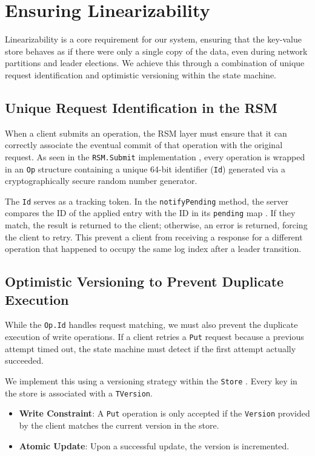 \section{Ensuring Linearizability}
\label{sec:linearizability_impl}
Linearizability is a core requirement for our system, ensuring that the key-value store behaves as if there were only a single copy of the data, even during network partitions and leader elections. We achieve this through a combination of unique request identification and optimistic versioning within the state machine.

\subsection{Unique Request Identification in the RSM}
When a client submits an operation, the RSM layer must ensure that it can correctly associate the eventual commit of that operation with the original request. As seen in the \texttt{RSM.Submit} implementation \cite{rsm_go}, every operation is wrapped in an \texttt{Op} structure containing a unique 64-bit identifier (\texttt{Id}) generated via a cryptographically secure random number generator.

The \texttt{Id} serves as a tracking token. In the \texttt{notifyPending} method, the server compares the ID of the applied entry with the ID in its \texttt{pending} map \cite{rsm_go}. If they match, the result is returned to the client; otherwise, an error is returned, forcing the client to retry. This prevent a client from receiving a response for a different operation that happened to occupy the same log index after a leader transition.

\subsection{Optimistic Versioning to Prevent Duplicate Execution}
While the \texttt{Op.Id} handles request matching, we must also prevent the duplicate execution of write operations. If a client retries a \texttt{Put} request because a previous attempt timed out, the state machine must detect if the first attempt actually succeeded.

We implement this using a versioning strategy within the \texttt{Store} \cite{store_go}. Every key in the store is associated with a \texttt{TVersion}.
\begin{itemize}
    \item \textbf{Write Constraint}: A \texttt{Put} operation is only accepted if the \texttt{Version} provided by the client matches the current version in the store.
    \item \textbf{Atomic Update}: Upon a successful update, the version is incremented.
\end{itemize}

